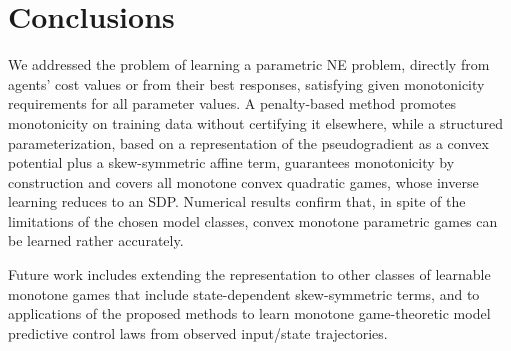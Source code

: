 \documentclass[11pt, a4paper]{article}
\theoremstyle{remark}
\theoremstyle{plain}
\begin{document}
\section{Conclusions}
\label{sec:conclusions}
We addressed the problem of learning a parametric NE problem, directly from agents' cost values or from their best responses, satisfying given monotonicity requirements for all parameter values. A penalty-based method promotes monotonicity on training data without certifying it elsewhere, while a structured parameterization, based on a representation of the pseudogradient as a convex potential plus a skew-symmetric affine term, guarantees monotonicity by construction and covers all monotone convex quadratic games, whose inverse learning reduces to an SDP. Numerical results confirm that, in spite of the limitations of the chosen model classes, convex monotone parametric games can be learned rather accurately.

Future work includes extending the representation to other classes of learnable monotone games that include state-dependent skew-symmetric terms, and to applications of the proposed methods to learn monotone game-theoretic model predictive control laws from observed input/state trajectories.
\end{document}

